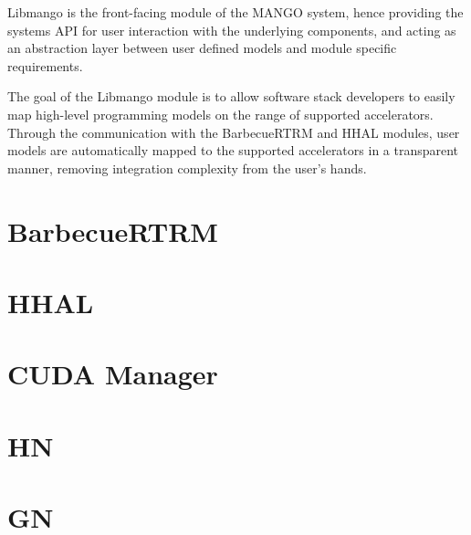Libmango is the front-facing module of the MANGO system, hence providing the systems API for user interaction with the underlying components, and acting as an abstraction layer between user defined models and module specific requirements.

The goal of the Libmango module is to allow software stack developers to easily map high-level programming models on the range of supported accelerators. Through the communication with the BarbecueRTRM and HHAL modules, user models are automatically mapped to the supported accelerators in a transparent manner, removing integration complexity from the user's hands.


\section{BarbecueRTRM}

\section{HHAL}

\section{CUDA Manager}

\section{HN}

\section{GN}